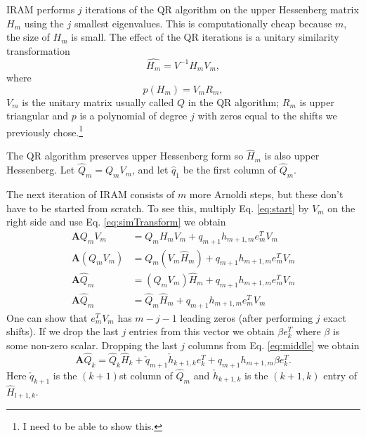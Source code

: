 \documentclass[12pt]{article}
\newcommand{\A}{\mathbf{A}}
\begin{document}
IRAM performs $j$ iterations of the QR algorithm on the upper Hessenberg matrix $H_m$ using the $j$ smallest eigenvalues.  This is computationally cheap because $m$, the size of $H_m$ is small.  The effect of the QR iterations is a unitary similarity transformation
\begin{equation}
    \hat{H_m} = V^{-1}H_mV_m,
    \label{eq:simTransform}
\end{equation}
where
\begin{equation}
    p(H_m) = V_mR_m,
\end{equation}
$V_m$ is the unitary matrix usually called $Q$ in the QR algorithm; $R_m$ is upper triangular and $p$ is a polynomial of degree $j$ with zeros equal to the shifts we previously chose.\footnote{I need to be able to show this.}

The QR algorithm preserves upper Hessenberg form so $\hat{H}_m$ is also upper Hessenberg.  Let $\hat{Q}_m = Q_mV_m$, and let $\hat{q}_1$ be the first column of $\hat{Q}_m$.

The next iteration of IRAM consists of $m$ more Arnoldi steps, but these don't have to be started from scratch.  To see this, multiply Eq. \ref{eq:start} by $V_m$ on the right side and use Eq. \ref{eq:simTransform} we obtain
\begin{subequations}\begin{align}
    \A Q_mV_m &= Q_mH_mV_m + q_{m+1}h_{m+1,m}e_m^TV_m \\
    \A \left(Q_mV_m\right) &= Q_m\left(V_m\hat{H}_m\right) + q_{m+1}h_{m+1,m}e_m^TV_m \\
    \A \hat{Q}_m &= \left(Q_mV_m\right)\hat{H}_m + q_{m+1}h_{m+1,m}e_m^TV_m \\
    \A \hat{Q}_m &= \hat{Q}_m\hat{H}_m + q_{m+1}h_{m+1,m}e_m^TV_m  \label{eq:middle}
\end{align}\end{subequations}
One can show that $e_m^TV_m$ has $m-j-1$ leading zeros (after performing $j$ exact shifts).  If we drop the last $j$ entries from this vector we obtain $\beta e_k^T$ where $\beta$ is some non-zero scalar.  Dropping the last $j$ columns from Eq. \ref{eq:middle} we obtain
\begin{equation}
    \A \hat{Q}_k = \hat{Q}_k\hat{H}_k + \check{q}_{m+1}\check{h}_{k+1,k}e_k^T + q_{m+1}h_{m+1,m}\beta e_k^T.
    \label{eq:midCheck}
\end{equation}
Here $\check{q}_{k+1}$ is the $(k+1)$st column of $\hat{Q}_m$ and $\check{h}_{k+1,k}$ is the $(k+1,k)$ entry of $\hat{H}_{l+1,k}$.
\end{document}
